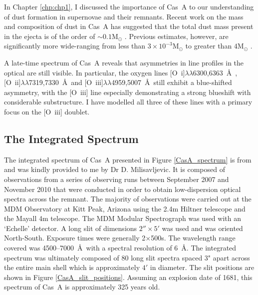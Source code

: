 In Chapter \ref{chp:chp1}, I discussed the importance of Cas~A to our understanding of dust formation in supernovae and their remnants.  Recent work on the mass and composition of dust in Cas~A has suggested that the total dust mass present in the ejecta is of the order of $\sim0.1$M$_{\odot}$ \citep{Barlow2010,Nozawa2010,Arendt2014}.  Previous estimates, however, are significantly more wide-ranging from less than $3\times10^{-3}$M$_{\odot}$ to greater than $4$M$_{\odot}$ \citep{Milisavljevic2012}.  


A late-time spectrum of Cas~A reveals that asymmetries in line profiles in the optical are still visible.  In particular, the oxygen lines [O~{\sc i}]$\lambda\lambda$6300,6363~\AA\ , [O~{\sc ii}]$\lambda\lambda$7319,7330~\AA\  and [O~{\sc iii}]$\lambda\lambda$4959,5007~\AA\  still exhibit a blue-shifted asymmetry, with the [O~{\sc iii}] line especially demonstrating a strong blueshift with considerable substructure.  I have modelled all three of these lines with a primary focus on the [O~{\sc iii}] doublet.

\subsection{The Integrated Spectrum}

The integrated spectrum of Cas~A presented in Figure \ref{CasA_spectrum} is from \citet{Milisavljevic2013} and was kindly provided to me by Dr D. Milisavljevic.  It is composed of observations from a series of observing runs between September 2007 and November 2010 that were conducted in order to obtain low-dispersion optical spectra across the remnant.  The majority of observations were carried out at the MDM Observatory at Kitt Peak, Arizona using the 2.4m Hiltner telescope and the Mayall 4m telescope.  The MDM Modular Spectrograph was used with an `Echelle' detector.  A long slit of dimensions $2''\times5'$ was used and was oriented North-South.  Exposure times were generally 2$\times$500s.  The wavelength range covered was 4500--7000~\AA\  with a spectral resolution of 6~\AA.  
The integrated spectrum was ultimately composed of 80 long slit spectra spaced 3" apart across the entire main shell which is approximately $4'$ in diameter.  The slit positions are shown in Figure \ref{CasA_slit_positions}.  Assuming an explosion date of 1681, this spectrum of Cas~A is approximately 325 years old.

